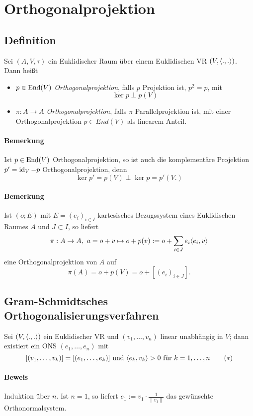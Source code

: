 \section{Orthogonalprojektion}
\subsection{Definition}
\begin{Definition}[Orthogonalprojektion]
	Sei $ (A,V,\tau) $ ein Euklidischer Raum über einem Euklidischen VR $ (V, \langle .,. \rangle) $. Dann heißt
		\begin{itemize}
			\item $ p\in \operatorname{End}(V) $ \emph{Orthogonalprojektion}, falls $ p $ Projektion ist, $ p^2 = p $, mit
				\[ \ker p \perp p(V) \]
			\item $ \pi: A\to A $ \emph{Orthogonalprojektion}, falls $ \pi $ Parallelprojektion ist, mit einer Orthogonalprojektion $ p\in End(V) $ als linearem Anteil.
		\end{itemize}
\end{Definition}
\paragraph{Bemerkung}
	Ist $ p\in \operatorname{End}(V) $ Orthogonalprojektion, so ist auch die komplementäre Projektion $ p' = \operatorname{id}_V-p $ Orthogonalprojektion, denn
		\[ \ker p' = p(V)\perp \ker p = p'(V.) \]
\paragraph{Bemerkung}
	Ist $ (o;E) $ mit $ E=(e_i)_{i\in I} $ kartesisches Bezugssystem eines Euklidischen Raumes $ A $ und $ J\subset I $, so liefert
		\[ \pi: A\to A,\ a = o+v \mapsto o+p(v) := o+\sum_{i\in J}e_i\langle e_i,v \rangle \]
	eine Orthogonalprojektion von $ A $ auf
		\[ \pi(A) = o + p(V) = o + [(e_i)_{i\in J}]. \]

\subsection{Gram-Schmidtsches Orthogonalisierungsverfahren}
	Sei $ (V,\langle .,. \rangle) $ ein Euklidischer VR und $ (v_1,\dots,v_n) $ linear unabhängig in $ V $; dann existiert ein ONS $ (e_1,\dots,e_n) $ mit
		\[ [(v_1,\dots,v_k)] = [(e_1,\dots,e_k)] \text{ und } \langle e_k,v_k \rangle > 0 \text{ für } k = 1,\dots,n \tag{$ * $} \]
\paragraph{Beweis}
	Induktion über $ n $. Ist $ n=1 $, so liefert $ e_1 := v_1\cdot\frac{1}{\|v_1\|} $ das gewünschte Orthonormalsystem. 
	

